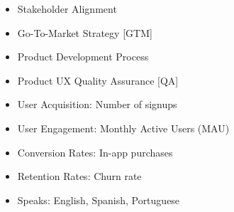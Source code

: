 
  \begin{itemize}
    \setlength\itemsep{-0.3em}
    \item Stakeholder Alignment
    \item Go-To-Market Strategy [GTM]
    \item Product Development Process
    \item Product UX Quality Assurance [QA]
\item User Acquisition: Number of signups
\item User Engagement: Monthly Active Users (MAU)
\item Conversion Rates: In-app purchases
\item Retention Rates: Churn rate
    \item Speaks: English, Spanish, Portuguese
  \end{itemize}

